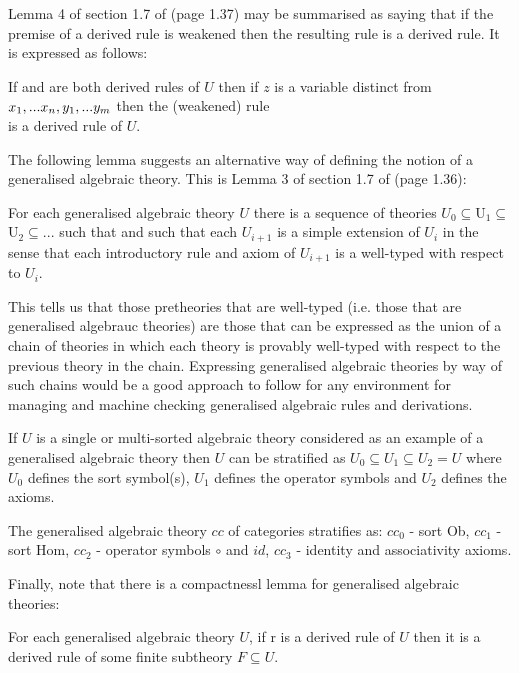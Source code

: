 Lemma 4 of section 1.7 of \cite{Cartmell78} (page 1.37) may be summarised as saying that if the premise of a derived rule is weakened then the resulting rule is a derived rule. It is expressed as follows:
\begin{lemma}
If
  and
 are both derived rules of $U$ then if $z$ is a variable
distinct from $x_1,...x_n,y_1,...y_{m}$ then
the (weakened) rule \\
 is a derived rule
of $U$.
\end{lemma}

The following lemma suggests an  alternative way of defining the notion of a generalised algebraic theory. 
This is Lemma 3 of section 1.7 of \cite{Cartmell78} (page 1.36):
\begin{lemma}
 For each generalised algebraic theory $U$  there is a sequence of theories 
$U_0 \subseteq $U$_1 \subseteq $U$_2 \subseteq ...$ such that  
and such that each $U_{i+1}$ is a simple extension of $U_i$ in the sense that each introductory rule and axiom of $U_{i+1}$ is a well-typed  with respect to $U_i$.
\end{lemma}
This tells us that those pretheories that are well-typed (i.e. those that are generalised algebrauc theories) are those that can be expressed as the union of a chain of theories in which each theory is provably well-typed with respect to the previous theory in the chain.  
Expressing generalised algebraic theories by way of such chains would be a good approach to follow
for any environment for managing and machine checking generalised algebraic  rules and derivations.

\begin{example}
If $U$ is a single or multi-sorted algebraic theory considered as an example of a
 generalised algebraic theory then $U$ can be stratified as $U_0 \subseteq U_1 \subseteq U_2=U$
where $U_0$ defines the sort symbol(s), $U_1$ defines the operator symbols and $U_2$ defines the axioms. 
\end{example}

\begin{example}
 The generalised algebraic theory $cc$ of categories stratifies as: $cc_0$ - sort Ob,
$cc_1$ - sort Hom, $cc_2$ - operator symbols $\circ$ and $id$, $cc_3$ - identity and associativity axioms.
\end{example} 

 Finally, note that there is a compactnessl lemma for generalised algebraic theories:
\begin{lemma}
For each generalised algebraic theory $U$, if r is a derived rule of $U$ then it is a derived rule of some finite subtheory $F \subseteq U$. \
\end{lemma}



